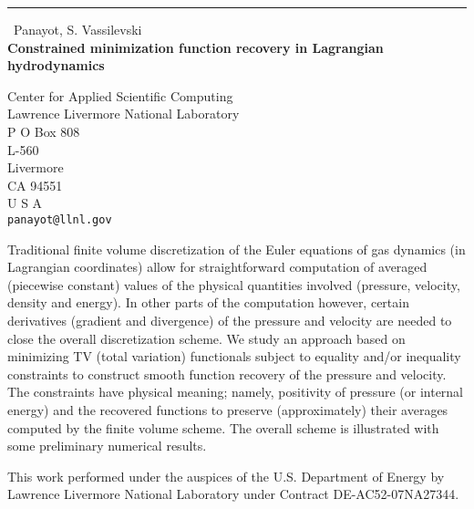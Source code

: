 \documentclass{report}
\begin{document}
\begin{center}
\rule{6in}{1pt} \
{\large Panayot, S. Vassilevski \\
{\bf Constrained minimization function recovery in Lagrangian hydrodynamics}}

Center for Applied Scientific Computing \\ Lawrence Livermore National Laboratory \\ P O Box 808 \\ L-560 \\ Livermore \\ CA 94551 \\ U S A
\\
{\tt panayot@llnl.gov}\end{center}

Traditional finite volume discretization of the Euler equations of gas
dynamics (in Lagrangian coordinates)
allow for straightforward computation of averaged (piecewise constant)
values of the physical quantities involved
(pressure, velocity, density and energy).
In other parts of the computation however, certain derivatives (gradient
and divergence) of the pressure and
velocity are needed to close the overall discretization scheme.
We study an approach based on minimizing TV (total variation) functionals subject to
equality and/or inequality constraints to construct smooth function recovery of the
pressure and velocity. The constraints have physical meaning; namely,
positivity of pressure (or internal energy)
and the recovered functions to preserve (approximately) their averages
computed by the finite volume scheme.
The overall scheme is illustrated with some preliminary numerical results.

This work performed under the auspices of the U.S. Department of Energy
by Lawrence Livermore National Laboratory under Contract
DE-AC52-07NA27344.
\end{document}

